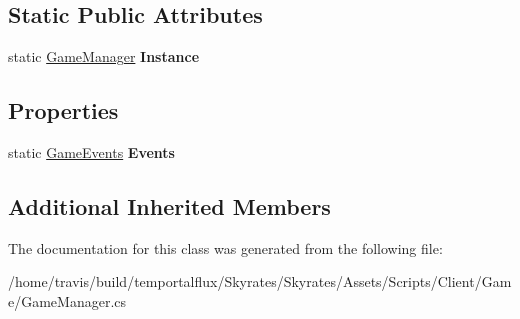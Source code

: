 \subsection*{Static Public Attributes}
\begin{DoxyCompactItemize}
\item 
\hypertarget{class_skyrates_1_1_client_1_1_game_1_1_game_manager_accacf771756ee6a41d2c0ced6bf798ca}{static \hyperlink{class_skyrates_1_1_client_1_1_game_1_1_game_manager}{Game\-Manager} {\bfseries Instance}}\label{class_skyrates_1_1_client_1_1_game_1_1_game_manager_accacf771756ee6a41d2c0ced6bf798ca}

\end{DoxyCompactItemize}
\subsection*{Properties}
\begin{DoxyCompactItemize}
\item 
\hypertarget{class_skyrates_1_1_client_1_1_game_1_1_game_manager_a0fe4743cbadedfc0ad93d51534f3d339}{static \hyperlink{class_skyrates_1_1_client_1_1_game_1_1_event_1_1_game_events}{Game\-Events} {\bfseries Events}}\label{class_skyrates_1_1_client_1_1_game_1_1_game_manager_a0fe4743cbadedfc0ad93d51534f3d339}

\end{DoxyCompactItemize}
\subsection*{Additional Inherited Members}


The documentation for this class was generated from the following file\-:\begin{DoxyCompactItemize}
\item 
/home/travis/build/temportalflux/\-Skyrates/\-Skyrates/\-Assets/\-Scripts/\-Client/\-Game/Game\-Manager.\-cs\end{DoxyCompactItemize}
